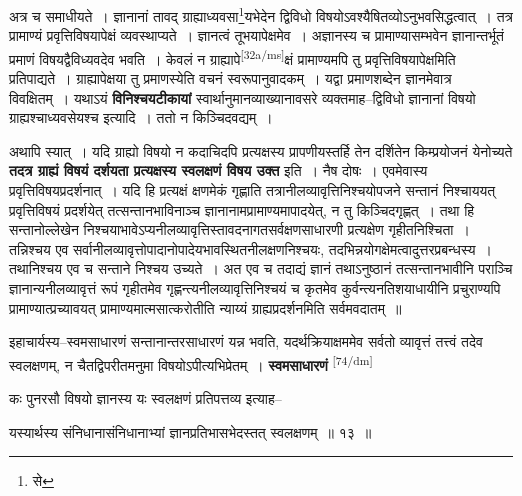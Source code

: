 \documentclass[article,12pt,a4paper]{memoir}
\begin{document}
	  \pstart अत्र च समाधीयते । ज्ञानानां तावद् ग्राह्याध्यवसा\footnote{से}यभेदेन द्विविधो विषयोऽवश्यैषितव्योऽनुभवसिद्धत्वात् । तत्र प्रामाण्यं प्रवृत्तिविषयापेक्षं व्यवस्थाप्यते । ज्ञानत्वं तूभयापेक्षमेव । अज्ञानस्य च प्रामाण्यासम्भवेन ज्ञानान्तर्भूतं प्रमाणं विषयद्वैविध्यवदेव भवति । केवलं न ग्राह्यापे\leavevmode\textsuperscript{\rmlatinfont\tiny [32a/ms]}क्षं प्रामाण्यमपि तु प्रवृत्तिविषयापेक्षमिति प्रतिपाद्यते । ग्राह्यापेक्षया तु प्रमाणस्येति वचनं स्वरूपानुवादकम् । यद्वा प्रमाणशब्देन ज्ञानमेवात्र विवक्षितम् । यथाऽयं \textbf{विनिश्चयटीकायां} स्वार्थानुमानव्याख्यानावसरे व्यक्तमाह--द्विविधो ज्ञानानां विषयो ग्राह्यश्चाध्यवसेयश्च इत्यादि । ततो न किञ्चिदवद्यम् ।
	\pend
      

	  \pstart अथापि स्यात् । यदि ग्राह्यो विषयो न कदाचिदपि प्रत्यक्षस्य प्रापणीयस्तर्हि तेन दर्शितेन किम्प्रयोजनं येनोच्यते \textbf{तदत्र ग्राह्यं विषयं दर्शयता प्रत्यक्षस्य स्वलक्षणं विषय उक्त} इति । नैष दोषः । एवमेवास्य प्रवृत्तिविषयप्रदर्शनात् । यदि हि प्रत्यक्षं क्षणमेकं गृह्णाति तत्रानीलव्यावृत्तिनिश्चयोपजने सन्तानं निश्चाययत् प्रवृत्तिविषयं प्रदर्शयेत् तत्सन्तानभाविनाञ्च ज्ञानानामप्रामाण्यमापादयेत्, न तु किञ्चिदगृह्णत् । तथा हि सन्तानोल्लेखेन निश्चयाभावेऽप्यनीलव्यावृत्तिस्तावदनागतसर्वक्षणसाधारणी प्रत्यक्षेण गृहीतनिश्चिता । तन्निश्चय एव सर्वानीलव्यावृत्तोपादानोपादेयभावस्थितनीलक्षणनिश्चयः, तदभिन्नयोगक्षेमत्वादुत्तरप्रबन्धस्य । तथानिश्चय एव च सन्ताने निश्चय उच्यते । अत एव च तदाद्यं ज्ञानं तथाऽनुष्ठानं तत्सन्तानभावीनि पराञ्चि ज्ञानान्यनीलव्यावृत्तं रूपं गृहीतमेव गृह्णन्त्यनीलव्यावृत्तिनिश्चयं च कृतमेव कुर्वन्त्यनतिशयाधायीनि प्रचुराण्यपि प्रामाण्यात्प्रच्यावयत् प्रामाण्यमात्मसात्करोतीति न्याय्यं ग्राह्यप्रदर्शनमिति सर्वमवदातम् ॥
	\pend
      

	  \pstart इहाचार्यस्य--स्वमसाधारणं सन्तानान्तरसाधारणं यन्न भवति, यदर्थक्रियाक्षममेव सर्वतो व्यावृत्तं तत्त्वं तदेव स्वलक्षणम्, न चैतद्विपरीतमनुमा विषयोऽपीत्यभिप्रेतम् । \textbf{स्वमसाधारणं} \leavevmode\textsuperscript{\rmlatinfont\tiny [74/dm]} 
	  
	कः पुनरसौ विषयो ज्ञानस्य यः स्वलक्षणं प्रतिपत्तव्य इत्याह-- 
	  
	यस्यार्थस्य संनिधानासंनिधानाभ्यां ज्ञानप्रतिभासभेदस्तत् स्वलक्षणम् ॥ १३ ॥ 
	  
\end{document}
